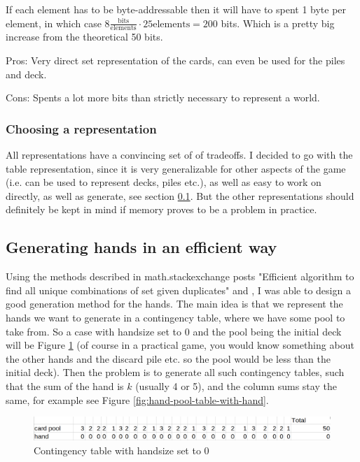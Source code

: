 If each element has to be byte-addressable then it will have to spent 1 byte per element, in which case $8 \frac{\text{bits}}{\text{elements}} \cdot 25\text{elements} = 200$ bits. Which is a pretty big increase from the theoretical 50 bits.  

Pros: Very direct set representation of the cards, can even be used for the piles and deck. 

Cons: Spents a lot more bits than strictly necessary to represent a world.


\subsubsection{Choosing a representation}
All representations have a convincing set of of tradeoffs. I decided to go with the table representation, since it is very generalizable for other aspects of the game (i.e. can be used to represent decks, piles etc.), as well as easy to work on directly, as well as generate, see section \ref{sec:efficient-generation-of-hands}. 
But the other representations should definitely be kept in mind if memory proves to be a problem in practice.


\subsection{Generating hands in an efficient way} \label{sec:efficient-generation-of-hands}
Using the methods described in math.stackexchange posts "Efficient algorithm to find all unique combinations of set given duplicates" \cite{HardmathcontigencyTablePost} and \cite{GCabrecursiveGenerationPost}, I was able to design a good generation method for the hands. 
The main idea is that we represent the hands we want to generate in a contingency table, where we have some pool to take from. So a case with handsize set to 0 and the pool being the initial deck will be Figure \ref{fig:hand-pool-table} (of course in a practical game, you would know something about the other hands and the discard pile etc. so the pool would be less than the initial deck). Then the problem is to generate all such contingency tables, such that the sum of the hand is $k$ (usually 4 or 5), and the column sums stay the same, for example see Figure \ref{fig:hand-pool-table-with-hand}.

\begin{figure}
	\centering
\includegraphics[width=13cm,frame]{images/contigency_table.png}
	\caption{Contingency table with handsize set to 0}
	\label{fig:hand-pool-table}
\end{figure}


